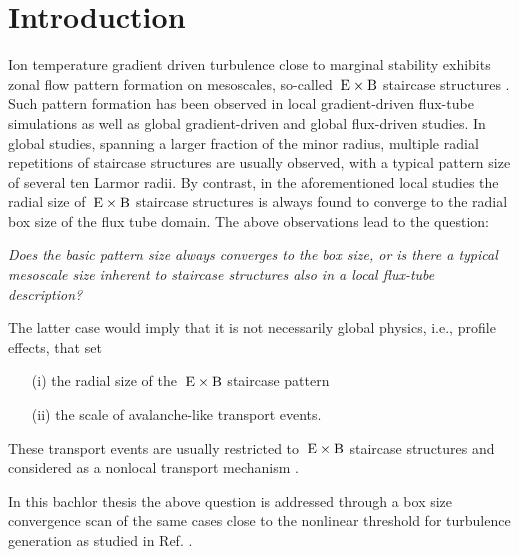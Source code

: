 
\chapter{Introduction}
\label{chap:intro}
\thispagestyle{empty}
\newpage

Ion temperature gradient driven turbulence close to marginal stability exhibits zonal flow pattern formation on mesoscales, so-called $\mathrm{\:E}\times\mathrm{B}$ staircase structures \cite{pradalier2010}.
Such pattern formation has been observed in local gradient-driven flux-tube simulations \cite{peeters2016, weikl2017, rath2021} as well as global gradient-driven \cite{mcmillan2009, villard2013, seo2022} and global flux-driven \cite{pradalier2010, pradalier2015, wang2020, kim2022, kishimoto2023} studies. 
In global studies, spanning a larger fraction of the minor radius, multiple radial repetitions of staircase structures are usually observed, with a typical pattern size of several ten Larmor radii.
By contrast, in the aforementioned local studies the radial size of $\mathrm{\:E}\times\mathrm{B}$ staircase structures is always found to converge to the radial box size of the flux tube domain.
The above observations lead to the question: \bigskip


\textit{Does the basic pattern size always converges to the box size, or is there a typical mesoscale size inherent to staircase structures also in a local flux-tube description?}\bigskip

The latter case would imply that it is not necessarily global physics, i.e., profile effects, that set 
\begin{itemize}
	\item[(i)] the radial size of the $\mathrm{\:E}\times\mathrm{B}$ staircase pattern
	\item[(ii)] the scale of avalanche-like transport events.
\end{itemize}
These transport events are usually restricted to $\mathrm{\:E}\times\mathrm{B}$ staircase structures and considered as a nonlocal transport mechanism \cite{pradalier2010}. \bigskip

In this bachlor thesis the above question is addressed through a box size convergence scan of the same cases close to the nonlinear threshold for turbulence generation as studied in Ref. .

